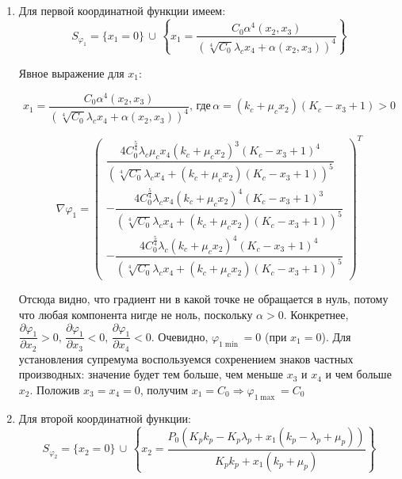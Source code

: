 \documentclass[12pt,a4paper]{article}
\begin{document}
\begin{enumerate}
    
    \item Для первой координатной функции имеем:
    \[ S_{\varphi_1} = \{ x_1 = 0\}\, \cup \, 
    \left\{ x_1 = 
    \frac{C_{0} \alpha^{4}{\left(x_{2},x_{3} \right)}}{\left(\sqrt[4]{C_{0}} \lambda_{c} x_{4} + \alpha{\left(x_{2},x_{3} \right)}\right)^{4}}
    \right\} \]

    Явное выражение для $x_1$:

        
        $$ x_1 = \frac{C_{0} \alpha^{4}{\left(x_{2},x_{3} \right)}}{\left(\sqrt[4]{C_{0}} \lambda_{c} x_{4} + \alpha{\left(x_{2},x_{3} \right)}\right)^{4}},\, \text{где}\, \alpha = \left(k_{c} + \mu_{c} x_{2}\right) \left(K_{c} - x_{3} + 1\right) > 0$$

        
        $$\nabla \varphi_1 = \left(
            \begin{matrix}\dfrac{4 C_{0}^{\frac{5}{4}} \lambda_{c} \mu_{c} x_{4} \left(k_{c} + \mu_{c} x_{2}\right)^{3} \left(K_{c} - x_{3} + 1\right)^{4}}{\left(\sqrt[4]{C_{0}} \lambda_{c} x_{4} + \left(k_{c} + \mu_{c} x_{2}\right) \left(K_{c} - x_{3} + 1\right)\right)^{5}} 
            \\
            - \dfrac{4 C_{0}^{\frac{5}{4}} \lambda_{c} x_{4} \left(k_{c} + \mu_{c} x_{2}\right)^{4} \left(K_{c} - x_{3} + 1\right)^{3}}{\left(\sqrt[4]{C_{0}} \lambda_{c} x_{4} + \left(k_{c} + \mu_{c} x_{2}\right) \left(K_{c} - x_{3} + 1\right)\right)^{5}} 
            \\
            - \dfrac{4 C_{0}^{\frac{5}{4}} \lambda_{c} \left(k_{c} + \mu_{c} x_{2}\right)^{4} \left(K_{c} - x_{3} + 1\right)^{4}}{\left(\sqrt[4]{C_{0}} \lambda_{c} x_{4} + \left(k_{c} + \mu_{c} x_{2}\right) \left(K_{c} - x_{3} + 1\right)\right)^{5}}
            \end{matrix}\right)^T $$

    Отсюда видно, что градиент ни в какой точке не обращается в нуль, потому что любая компонента нигде не ноль, поскольку \(\alpha > 0.\)
    Конкретнее,
    \(\dfrac{\partial \varphi_1}{\partial x_2} > 0,\,  \dfrac{\partial \varphi_1}{\partial x_3} < 0,\,  \dfrac{\partial \varphi_1}{\partial x_4} < 0.\)
    Очевидно, \(\varphi_{1 \min} = 0\) (при \(x_1 = 0\)). Для установления
    супремума воспользуемся сохренением знаков частных производных: значение будет тем больше, чем меньше \(x_3\) и \(x_4\) и чем больше \(x_2\). Положив
    \(x_3 = x_4 = 0\), получим
    \(x_1 = C_0 \Rightarrow \varphi_{1 \max} = C_0\)

    \item Для второй координатной функции:
    \[ S_{\varphi_2} = \{ x_2 = 0\}\, \cup \, 
    \left\{ x_2 = 
    \dfrac{P_{0} \left(K_{p} k_{p} - K_{p} \lambda_{p} + x_{1} \left(k_{p} - \lambda_{p} + \mu_{p}\right)\right)}{K_{p} k_{p} + x_{1} \left(k_{p} + \mu_{p}\right)}
    \right\} \]
    

\end{enumerate}
\end{document}
